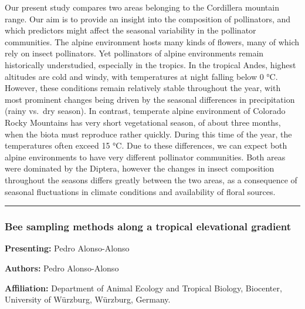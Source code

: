 \documentclass[
  letterpaper,
  DIV=11,
  numbers=noendperiod]{scrartcl}
\begin{document}
Our present study compares two areas belonging to the Cordillera
mountain range. Our aim is to provide an insight into the composition of
pollinators, and which predictors might affect the seasonal variability
in the pollinator communities. The alpine environment hosts many kinds
of flowers, many of which rely on insect pollinators. Yet pollinators of
alpine environments remain historically understudied, especially in the
tropics. In the tropical Andes, highest altitudes are cold and windy,
with temperatures at night falling below 0 °C. However, these conditions
remain relatively stable throughout the year, with most prominent
changes being driven by the seasonal differences in precipitation (rainy
vs.~dry season). In contrast, temperate alpine environment of Colorado
Rocky Mountains has very short vegetational season, of about three
months, when the biota must reproduce rather quickly. During this time
of the year, the temperatures often exceed 15 °C. Due to these
differences, we can expect both alpine environments to have very
different pollinator communities. Both areas were dominated by the
Diptera, however the changes in insect composition throughout the
seasons differs greatly between the two areas, as a consequence of
seasonal fluctuations in climate conditions and availability of floral
sources.

\begin{center}\rule{0.5\linewidth}{0.5pt}\end{center}

\subsubsection{Bee sampling methods along a tropical elevational
gradient}\label{bee-sampling-methods-along-a-tropical-elevational-gradient}

\textbf{Presenting:} Pedro Alonso-Alonso

\textbf{Authors:} Pedro Alonso-Alonso

\textbf{Affiliation:} Department of Animal Ecology and Tropical Biology,
Biocenter, University of Würzburg, Würzburg, Germany.
\end{document}
